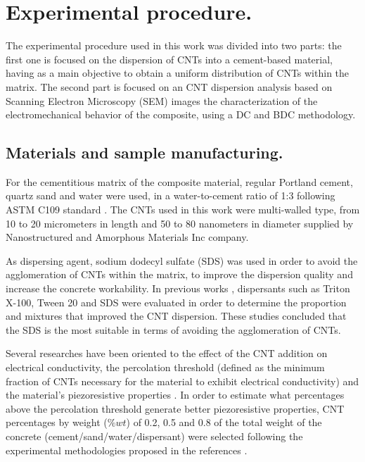 \documentclass[twocolumn]{bmcart}%
\begin{document}
\section{Experimental procedure.}

The experimental procedure used in this work was divided into two parts: the first one is focused on the dispersion of CNTs into a cement-based material, having as a main objective to obtain a uniform distribution of CNTs within the matrix. The second part is focused on an CNT dispersion analysis based on Scanning Electron Microscopy (SEM) images the characterization of the electromechanical behavior of the composite, using a  DC and BDC methodology. 

\subsection{Materials and sample manufacturing.}

For the cementitious matrix of the composite material, regular Portland cement, quartz sand and water were used, in a water-to-cement ratio of 1:3 following ASTM C109 standard \cite{ASTMC1092000}. The CNTs used in this work were multi-walled type, from 10 to 20 micrometers in length and 50 to 80 nanometers in diameter supplied by Nanostructured and Amorphous Materials Inc company.

As dispersing agent, sodium dodecyl sulfate (SDS) was used in order to avoid the agglomeration of CNTs within the matrix, to improve the dispersion quality and increase the concrete workability. In previous works \cite{Castaneda-Saldarriaga2019, Kyrylyuk2008, Shao2017, Myung2014, Sasmal2017, Rehman2018}, dispersants such as Triton X-100, Tween 20 and SDS were evaluated in order to determine the proportion and mixtures that improved the CNT dispersion. These studies concluded that the SDS is the most suitable in terms of avoiding the agglomeration of CNTs.

Several researches have been oriented to the effect of the CNT addition on electrical conductivity, the percolation threshold (defined as the minimum fraction of CNTs necessary for the material to exhibit electrical conductivity) and the material’s piezoresistive properties \cite{Garcia-Macias2017, Baeza2013a, Yoo2018a}. In order to estimate what percentages above the percolation threshold generate better piezoresistive properties, CNT percentages by weight ($\%wt$) of 0.2, 0.5 and 0.8 of the total weight of the concrete (cement/sand/water/dispersant) were selected following the experimental methodologies proposed in the references \cite{Coppola2011, Downey2017a, Cui2013}.
\end{document}
